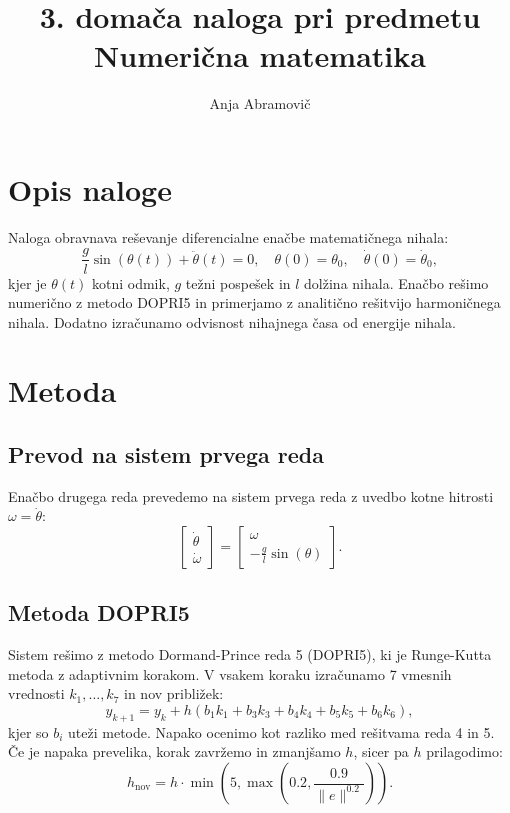 \documentclass[12pt]{article}
\title{3. domača naloga pri predmetu Numerična matematika}
\author{Anja Abramovič}
\date{}
\begin{document}
\maketitle

\section{Opis naloge}
Naloga obravnava reševanje diferencialne enačbe matematičnega nihala:
\begin{equation}
    \frac{g}{l}\sin(\theta(t)) + \ddot{\theta}(t) = 0, \quad \theta(0) = \theta_0, \quad \dot{\theta}(0) = \dot{\theta}_0,
\end{equation}
kjer je $\theta(t)$ kotni odmik, $g$ težni pospešek in $l$ dolžina nihala. Enačbo rešimo numerično z metodo DOPRI5 in primerjamo z analitično rešitvijo harmoničnega nihala. Dodatno izračunamo odvisnost nihajnega časa od energije nihala.


\section{Metoda}
\subsection*{Prevod na sistem prvega reda}
Enačbo drugega reda prevedemo na sistem prvega reda z uvedbo kotne hitrosti 
$\omega = \dot{\theta}$:
\begin{equation}
    \begin{bmatrix} \dot{\theta} \\ \dot{\omega} \end{bmatrix} = 
    \begin{bmatrix} \omega \\ -\frac{g}{l}\sin(\theta) \end{bmatrix}.
\end{equation}

\subsection*{Metoda DOPRI5}
Sistem rešimo z metodo Dormand-Prince reda 5 (DOPRI5), ki je Runge-Kutta metoda z adaptivnim korakom. V vsakem koraku izračunamo 7 vmesnih vrednosti 
$k_1, \ldots, k_7$ in nov približek:
\begin{equation}
    y_{k+1} = y_k + h(b_1 k_1 + b_3 k_3 + b_4 k_4 + b_5 k_5 + b_6 k_6),
\end{equation}
kjer so $b_i$ uteži metode. Napako ocenimo kot razliko med rešitvama reda 4 in 5. Če je napaka prevelika, korak zavržemo in zmanjšamo $h$, sicer pa $h$ prilagodimo:
\begin{equation}
    h_{\text{nov}} = h \cdot \min\left(5, \max\left(0.2, \frac{0.9}{\|e\|^{0.2}}\right)\right).
\end{equation}
\end{document}
